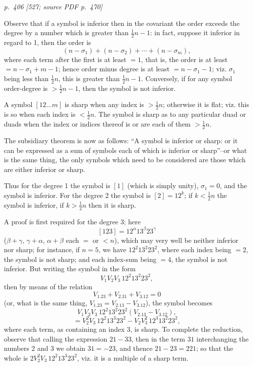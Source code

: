 \documentclass[11pt,a4paper]{article}
\newcommand{\pagemarker}[3]{\par\bigskip\noindent\textit{p.~#1 [#2; source PDF p.~#3]}\par\smallskip}
\begin{document}
\pagemarker{406}{527}{470}

Observe that if a symbol is inferior then in the covariant the order exceeds the
degree by a number which is greater than $\frac12n-1$: in fact, suppose it inferior in
regard to 1, then the order is
\[
(n-\sigma_1)+(n-\sigma_2)+\cdots+(n-\sigma_m),
\]
where each term after the first is at least $=1$, that is, the order is at least
$=n-\sigma_1+m-1$; hence order minus degree is at least $=n-\sigma_1-1$; viz.
$\sigma_1$ being less than $\frac12n$, this is greater than $\frac12n-1$. Conversely, if for
any symbol order-degree is $>\frac12n-1$, then the symbol is not inferior.

A symbol $[12\ldots m]$ is sharp when any index is $>\frac12n$; otherwise it is flat;
viz. this is so when each index is $<\frac12n$. The symbol is sharp as to any particular
duad or duads when the index or indices thereof is or are each of them $>\frac12n$.

The subsidiary theorem is now as follows: ``A symbol is inferior or sharp: or it can
be expressed as a sum of symbols each of which is inferior or sharp''--or what is the
same thing, the only symbols which need to be considered are those which are either
inferior or sharp.

Thus for the degree 1 the symbol is $[1]$ (which is simply unity), $\sigma_1=0$, and
the symbol is inferior. For the degree 2 the symbol is $[2]=12^k$; if $k<\frac12n$ the
symbol is inferior, if $k>\frac12n$ then it is sharp.

A proof is first required for the degree 3; here
\[
[123]=12^\alpha13^\beta23^\gamma
\]
($\beta+\gamma$, $\gamma+\alpha$, $\alpha+\beta$ each $=$ or $<n$), which may very
well be neither inferior nor sharp; for instance, if $n=5$, we have
$12^2 13^2 23^2$, where each index being $=2$, the symbol is not sharp; and each
index-sum being $=4$, the symbol is not inferior. But writing the symbol in the form
\[
V_1V_2V_3\,12^2 13^2 23^2,
\]
then by means of the relation
\[
V_1.23+V_2.31+V_3.12=0
\]
(or, what is the same thing, $V_1.23=V_2.13-V_3.12$), the symbol becomes
\[
V_1V_2V_3\,12^2 13^2 23^2(V_2.13-V_3.12),
\]
\[
=V_2^2V_3\,12^2 13^3 23^2-V_2V_3^2\,12^3 13^2 23^2,
\]
where each term, as containing an index 3, is sharp. To complete the reduction,
observe that calling the expression $21-33$, then in the term $31$ interchanging the
numbers 2 and 3 we obtain $31=-23$, and thence $21-23=221$; so that the whole is
$2V_2^2V_3\,12^2 13^3 23^2$, viz. it is a multiple of a sharp term.
\end{document}

